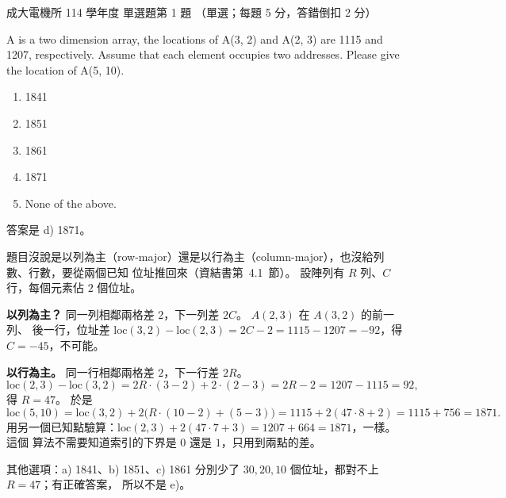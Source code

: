 \begin{pastexam}[label={px:ncku-114-ee-ds-01}]{成大電機所 114 學年度 單選題第 1 題}
（單選；每題 5 分，答錯倒扣 2 分）

A is a two dimension array, the locations of A(3, 2) and A(2, 3) are 1115 and 1207,
respectively. Assume that each element occupies two addresses. Please give the location of
A(5, 10).
\begin{enumerate}[label=\alph*)]
\item 1841
\item 1851
\item 1861
\item 1871
\item None of the above.
\end{enumerate}
\end{pastexam}

\begin{pastsoln}
答案是 d) 1871。

題目沒說是以列為主（row-major）還是以行為主（column-major），也沒給列數、行數，要從兩個已知
位址推回來（資結書第~4.1~節）。 設陣列有 $R$ 列、$C$ 行，每個元素佔 $2$ 個位址。

\textbf{以列為主？} 同一列相鄰兩格差 $2$，下一列差 $2C$。 $A(2, 3)$ 在 $A(3, 2)$ 的前一列、
後一行，位址差 $\mathrm{loc}(3, 2) - \mathrm{loc}(2, 3) = 2C - 2 = 1115 - 1207 = -92$，得
$C = -45$，不可能。

\textbf{以行為主。} 同一行相鄰兩格差 $2$，下一行差 $2R$。
\[
\mathrm{loc}(2, 3) - \mathrm{loc}(3, 2) = 2R \cdot (3 - 2) + 2 \cdot (2 - 3) = 2R - 2 = 1207 - 1115 = 92,
\]
得 $R = 47$。 於是
\[
\mathrm{loc}(5, 10) = \mathrm{loc}(3, 2) + 2\bigl(R \cdot (10 - 2) + (5 - 3)\bigr)
= 1115 + 2(47 \cdot 8 + 2) = 1115 + 756 = 1871.
\]
用另一個已知點驗算：$\mathrm{loc}(2, 3) + 2(47 \cdot 7 + 3) = 1207 + 664 = 1871$，一樣。 這個
算法不需要知道索引的下界是 $0$ 還是 $1$，只用到兩點的差。

其他選項：a) 1841、b) 1851、c) 1861 分別少了 $30, 20, 10$ 個位址，都對不上 $R = 47$；有正確答案，
所以不是 e)。
\end{pastsoln}

